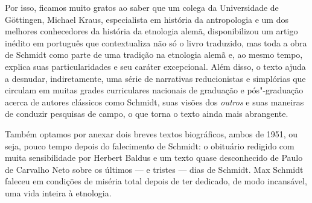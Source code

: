 Por isso, ficamos muito gratos ao saber que um colega da Universidade de Göttingen, Michael Kraus, especialista em história da antropologia e um dos melhores conhecedores da história da etnologia alemã, disponibilizou um artigo inédito em português que contextualiza não só o livro traduzido, mas toda a obra de Schmidt como parte de uma tradição na etnologia alemã e, ao mesmo tempo, explica suas particularidades e seu caráter excepcional. Além disso, o texto ajuda a desnudar, indiretamente, uma série de narrativas reducionistas e simplórias que circulam em muitas grades curriculares nacionais de graduação e pós"-graduação acerca de autores clássicos como Schmidt, suas visões dos \textit{outros} e suas maneiras de conduzir pesquisas de campo, o que torna o texto ainda mais abrangente.

Também optamos por anexar dois breves textos biográficos, ambos de 1951, ou seja, pouco tempo depois do falecimento de Schmidt: o obituário redigido com muita sensibilidade por Herbert Baldus e um texto quase desconhecido de Paulo de Carvalho Neto sobre os últimos --- e tristes --- dias de Schmidt. Max Schmidt faleceu em condições de miséria total depois de ter dedicado, de modo incansável, uma vida inteira à etnologia.








